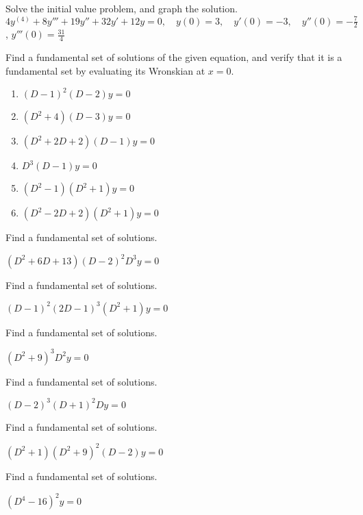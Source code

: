 \documentclass{ximera}
\begin{document}
\begin{problem}\label{exer:9.2.27}  Solve the
initial value problem, and graph the solution.
$4y^{(4)}+8y'''+19y''+32y'+12y=0, \quad  y(0)=3,\quad y'(0)=-3,\quad y''(0)=
-\frac{7}{2}$,
 $y'''(0)=\frac{31}{4}$
\end{problem}

\begin{problem}\label{exer:9.2.28}
Find a fundamental set of solutions of the given equation, and verify that it is a fundamental set by evaluating its Wronskian at $x=0$.

\begin{enumerate}
    \item $(D-1)^2(D-2)y=0$
    \item $(D^2+4)(D-3)y=0$
    \item $(D^2+2D+2)(D-1)y=0$
    \item $D^3(D-1)y=0$
    \item $(D^2-1)(D^2+1)y=0$
    \item $(D^2-2D+2)(D^2+1)y=0$
\end{enumerate}
\end{problem}

\begin{problem}\label{exer:9.2.29} Find a
fundamental set of solutions.

$(D^2+6D+13)(D-2)^2D^3y=0$
\end{problem}

\begin{problem}\label{exer:9.2.30} Find a
fundamental set of solutions.

$(D-1)^2(2D-1)^3(D^2+1)y=0$
\end{problem}

\begin{problem}\label{exer:9.2.31} Find a
fundamental set of solutions.

$(D^2+9)^3D^2y=0$
\end{problem}

\begin{problem}\label{exer:9.2.32}  Find a
fundamental set of solutions.

$(D-2)^3(D+1)^2Dy=0$
\end{problem}


\begin{problem}\label{exer:9.2.33}  Find a
fundamental set of solutions.

$(D^2+1)(D^2+9)^2(D-2)y=0$
\end{problem}

\begin{problem}\label{exer:9.2.34} Find a
fundamental set of solutions.

$(D^4-16)^2y=0$
\end{problem}
\end{document}
